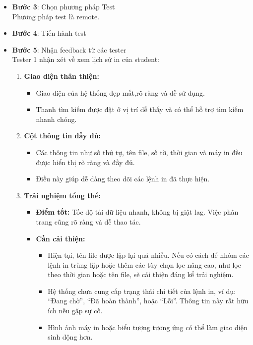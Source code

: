 \begin{itemize}
    \item \textbf{Bước 3}: Chọn phương pháp Test \\
    Phương pháp test là remote.
    \item \textbf{Bước 4}: Tiến hành test
    \item \textbf{Bước 5}: Nhận feedback từ các tester\\
    Tester 1 nhận xét về xem lịch sử in của student:  
    \begin{enumerate}
    \item \textbf{Giao diện thân thiện:} 
    \begin{itemize}
        \item Giao diện của hệ thống đẹp mắt,rõ ràng và dễ sử dụng. 
        \item Thanh tìm kiếm được đặt ở vị trí dễ thấy và có thể hỗ trợ tìm kiếm nhanh chóng.
    \end{itemize}

    \item \textbf{Cột thông tin đầy đủ:}
    \begin{itemize}
        \item Các thông tin như số thứ tự, tên file, số tờ, thời gian và máy in đều được hiển thị rõ ràng và đầy đủ.
        \item Điều này giúp dễ dàng theo dõi các lệnh in đã thực hiện.
    \end{itemize}

    \item \textbf{Trải nghiệm tổng thể:}
    \begin{itemize}
        \item \textbf{Điểm tốt:} Tốc độ tải dữ liệu nhanh, không bị giật lag. Việc phân trang cũng rõ ràng và dễ thao tác.
        \item \textbf{Cần cải thiện:}
        \begin{itemize}
            \item Hiện tại, tên file được lặp lại quá nhiều. Nếu có cách để nhóm các lệnh in trùng lặp hoặc thêm các tùy chọn lọc nâng cao, như lọc theo thời gian hoặc tên file, sẽ cải thiện đáng kể trải nghiệm.
            \item Hệ thống chưa cung cấp trạng thái chi tiết của lệnh in, ví dụ: ``Đang chờ'', ``Đã hoàn thành'', hoặc ``Lỗi''. Thông tin này rất hữu ích nếu gặp sự cố.
            \item Hình ảnh máy in hoặc biểu tượng tương ứng có thể làm giao diện sinh động hơn.
        \end{itemize}
    \end{itemize}


\end{enumerate}
\end{itemize}
